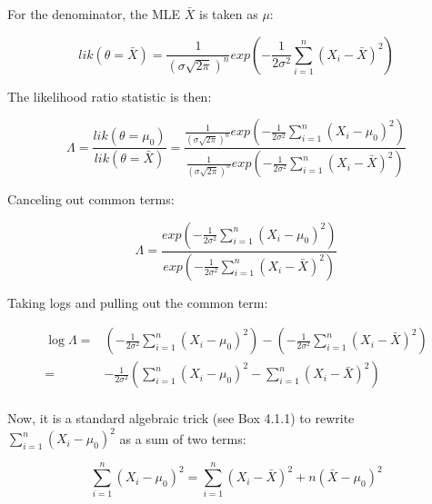 \documentclass[
  12pt,
]{krantz}
\theoremstyle{definition}
\theoremstyle{definition}
\theoremstyle{definition}
\theoremstyle{definition}
\theoremstyle{remark}
\begin{document}
For the denominator, the MLE \(\bar{X}\) is taken as \(\mu\):

\begin{equation}
lik(\theta=\bar{X}) =\frac{1}{(\sigma\sqrt{2\pi})^n} exp \left( -\frac{1}{2\sigma^2} \sum_{i=1}^n (X_i - \bar{X})^2 \right)
\end{equation}

The likelihood ratio statistic is then:

\begin{equation}
\Lambda = \frac{lik(\theta=\mu_0)}{lik(\theta=\bar{X})}=
\frac{\frac{1}{(\sigma\sqrt{2\pi})^n} 
           exp\left( -\frac{1}{2\sigma^2} \sum_{i=1}^n (X_i - \mu_0)^2  \right)}{\frac{1}{(\sigma\sqrt{2\pi})^n} 
           exp\left( -\frac{1}{2\sigma^2} \sum_{i=1}^n (X_i - \bar{X})^2  \right)}
\end{equation}

Canceling out common terms:

\begin{equation}
\Lambda = 
\frac{exp\left( -\frac{1}{2\sigma^2} \sum_{i=1}^n (X_i - \mu_0)^2  \right)}{
        exp\left( -\frac{1}{2\sigma^2} \sum_{i=1}^n (X_i - \bar{X})^2  \right)}
\end{equation}

Taking logs and pulling out the common term:

\begin{equation}
\begin{split}
\log \Lambda =& 
\left( -\frac{1}{2\sigma^2} \sum_{i=1}^n (X_i - \mu_0)^2  \right)-\left( -\frac{1}{2\sigma^2} \sum_{i=1}^n (X_i - \bar{X})^2  \right)\\
=& -\frac{1}{2\sigma^2} \left( \sum_{i=1}^n (X_i - \mu_0)^2  -  \sum_{i=1}^n (X_i - \bar{X})^2 \right)\\
\end{split}
\end{equation}

Now, it is a standard algebraic trick (see Box 4.1.1) to rewrite \(\sum_{i=1}^n (X_i -\mu_0)^2\) as a sum of two terms:

\begin{equation}
\sum_{i=1}^n (X_i -\mu_0)^2 = \sum_{i=1}^n (X_i - \bar{X})^2 + n(\bar{X} - \mu_0)^2 
\label{eq:simplification}
\end{equation}
\end{document}

